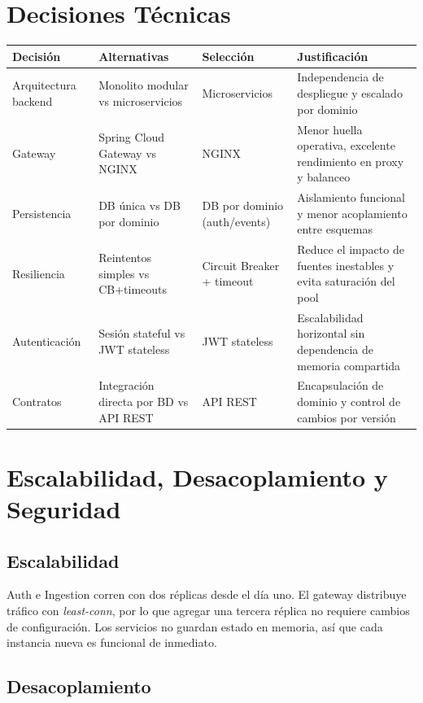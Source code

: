 \documentclass[12pt,a4paper]{article}
\begin{document}
\section{Decisiones Técnicas}

\begin{longtable}{p{}p{}p{}p{}}
\toprule
\textbf{Decisión} & \textbf{Alternativas} & \textbf{Selección} & \textbf{Justificación} \\
\midrule
Arquitectura backend & Monolito modular vs microservicios & Microservicios & Independencia de despliegue y escalado por dominio \\
Gateway & Spring Cloud Gateway vs NGINX & NGINX & Menor huella operativa, excelente rendimiento en proxy y balanceo \\
Persistencia & DB única vs DB por dominio & DB por dominio (auth/events) & Aislamiento funcional y menor acoplamiento entre esquemas \\
Resiliencia & Reintentos simples vs CB+timeouts & Circuit Breaker + timeout & Reduce el impacto de fuentes inestables y evita saturación del pool \\
Autenticación & Sesión stateful vs JWT stateless & JWT stateless & Escalabilidad horizontal sin dependencia de memoria compartida \\
Contratos & Integración directa por BD vs API REST & API REST & Encapsulación de dominio y control de cambios por versión \\
\bottomrule
\end{longtable}

\section{Escalabilidad, Desacoplamiento y Seguridad}

\subsection{Escalabilidad}

Auth e Ingestion corren con dos réplicas desde el día uno. El gateway distribuye tráfico con \textit{least-conn}, por lo que agregar una tercera réplica no requiere cambios de configuración. Los servicios no guardan estado en memoria, así que cada instancia nueva es funcional de inmediato.

\subsection{Desacoplamiento}
\end{document}
